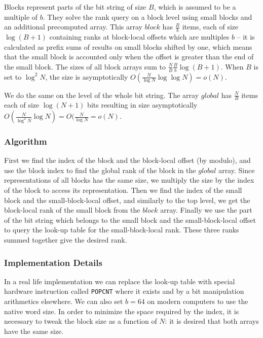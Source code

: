 Blocks represent parts of the bit string of size $B$, which is assumed to be a multiple of $b$.
They solve the rank query on a block level using small blocks and an additional precomputed array.
This array $block$ has $\frac{B}{b}$ items, each of size $\log (B + 1)$ containing ranks at block-local offsets which are multiples $b$ -- it is calculated as prefix sums of results on small blocks shifted by one, which means that the small block is accounted only when the offset is greater than the end of the small block.
The sizes of all block arrays sum to $\frac{N}{B} \frac{B}{b} \log (B + 1)$.
When $B$ is set to $\log^2 N$, the size is asymptotically $O(\frac{N}{\log N} \log \log N) = o(N)$.

We do the same on the level of the whole bit string.
The array $global$ has $\frac{N}{B}$ items each of size $\log (N+1)$ bits resulting in size asymptotically $O(\frac{N}{\log^2 N} \log{N}) = O(\frac{N}{\log N} = o(N)$.

\subsubsection{Algorithm}

First we find the index of the block and the block-local offset (by modulo), and use the block index to find the global rank of the block in the $global$ array.
Since representations of all blocks has the same size, we multiply the size by the index of the block to access its representation.
Then we find the index of the small block and the small-block-local offset, and similarly to the top level, we get the block-local rank of the small block from the $block$ array.
Finally we use the part of the bit string which belongs to the small block and the small-block-local offset to query the look-up table for the small-block-local rank.
These three ranks summed together give the desired rank.

\subsubsection{Implementation Details}

In a real life implementation we can replace the look-up table with special hardware instruction called \verb|POPCNT| where it exists and by a bit manipulation arithmetics elsewhere.
We can also set $b = 64$ on modern computers to use the native word size.
In order to minimize the space required by the index, it is necessary to tweak the block size as a function of $N$: it is desired that both arrays have the same size.

